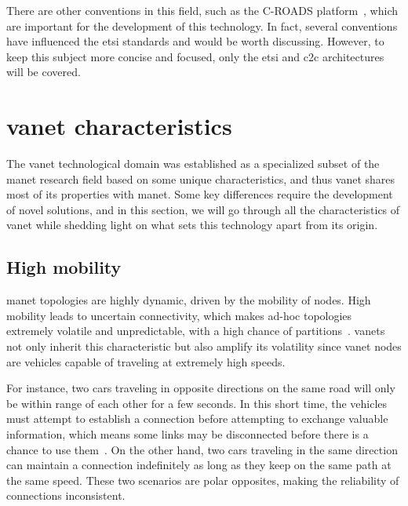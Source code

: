 There are other conventions in this field, such as the C-ROADS platform~\cite{noauthor_platform_nodate}, which are important for the development of this technology. In fact, several conventions have influenced the \gls{etsi} standards and would be worth discussing. However, to keep this subject more concise and focused, only the \gls{etsi} and \gls{c2c} architectures will be covered.




\section[VANET characteristics]{\gls{vanet} characteristics}
\label{sec:VANET_characteristics}

The \gls{vanet} technological domain was established as a specialized subset of the \gls{manet} research field based on some unique characteristics, and thus \gls{vanet} shares most of its properties with \gls{manet}. Some key differences require the development of novel solutions, and in this section, we will go through all the characteristics of \gls{vanet} while shedding light on what sets this technology apart from its origin.

\subsection{High mobility}
\label{subsec:high_mob}

\gls{manet} topologies are highly dynamic, driven by the mobility of nodes. High mobility leads to uncertain connectivity, which makes ad-hoc topologies extremely volatile and unpredictable, with a high chance of partitions~\cite{toor_vehicle_2008}. \glspl{vanet} not only inherit this characteristic but also amplify its volatility since \gls{vanet} nodes are vehicles capable of traveling at extremely high speeds. 

For instance, two cars traveling in opposite directions on the same road will only be within range of each other for a few seconds. In this short time, the vehicles must attempt to establish a connection before attempting to exchange valuable information, which means some links may be disconnected before there is a chance to use them~\cite{liang_vehicular_2015}. On the other hand, two cars traveling in the same direction can maintain a connection indefinitely as long as they keep on the same path at the same speed. These two scenarios are polar opposites, making the reliability of connections inconsistent.

